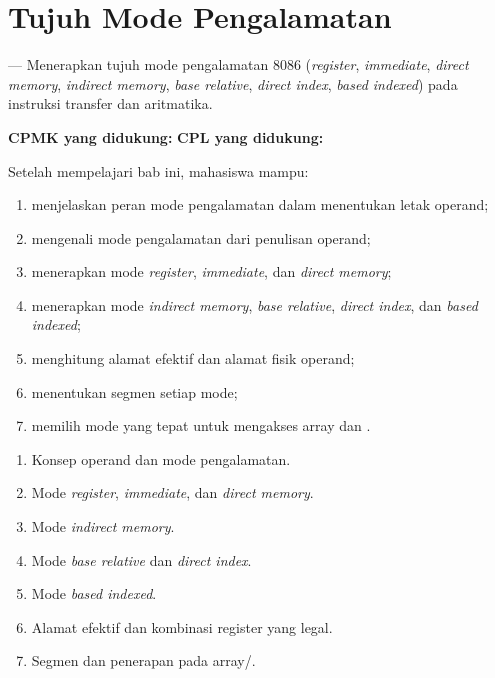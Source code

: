 \documentclass[../../main.tex]{subfiles}
\begin{document}
\chapter{Tujuh Mode Pengalamatan}
\label{chap:mode-pengalamatan}


\begin{subcpmkbox}
\vspace{1.1em}
 --- Menerapkan tujuh mode pengalamatan 8086
(\textit{register}, \textit{immediate}, \textit{direct memory},
\textit{indirect memory}, \textit{base relative}, \textit{direct
index}, \textit{based indexed}) pada instruksi transfer dan
aritmatika.

\vspace{0.4em}
\textbf{CPMK yang didukung:}  \quad\textbullet\quad
\textbf{CPL yang didukung:} 
\end{subcpmkbox}

\begin{tujuanbox}
\vspace{1.1em}
Setelah mempelajari bab ini, mahasiswa mampu:
\begin{enumerate}
    \item menjelaskan peran mode pengalamatan dalam menentukan letak
          operand;
    \item mengenali mode pengalamatan dari penulisan operand;
    \item menerapkan mode \textit{register}, \textit{immediate}, dan
          \textit{direct memory};
    \item menerapkan mode \textit{indirect memory}, \textit{base
          relative}, \textit{direct index}, dan \textit{based
          indexed};
    \item menghitung alamat efektif dan alamat fisik operand;
    \item menentukan segmen  setiap mode;
    \item memilih mode yang tepat untuk mengakses array dan
          .
\end{enumerate}
\end{tujuanbox}

\begin{materibox}
\vspace{1.1em}
\begin{enumerate}
    \item Konsep operand dan mode pengalamatan.
    \item Mode \textit{register}, \textit{immediate}, dan
          \textit{direct memory}.
    \item Mode \textit{indirect memory}.
    \item Mode \textit{base relative} dan \textit{direct index}.
    \item Mode \textit{based indexed}.
    \item Alamat efektif dan kombinasi register yang legal.
    \item Segmen  dan penerapan pada array/.
\end{enumerate}
\end{materibox}










\end{document}
